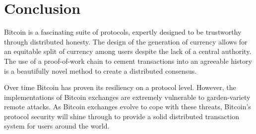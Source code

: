 \documentclass{report}
\begin{document}
\section*{Conclusion}
Bitcoin is a fascinating suite of protocols, expertly designed to be
trustworthy through distributed honesty. The design of the generation of currency allows for an equitable
split of currency among users despite the lack of a central authority. The
use of a proof-of-work chain to cement transactions into an agreeable history is
a beautifully novel method to create a distributed consensus.

Over time Bitcoin has proven its resiliency on a protocol level. However, the
implementations of Bitcoin exchanges are extremely vulnerable to garden-variety
remote attacks. As Bitcoin exchanges evolve to cope with these threats, Bitcoin's
protocol security will shine through to provide a solid distributed transaction
system for users around the world.

{}

\end{document}
